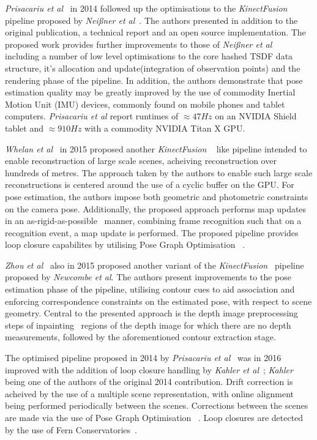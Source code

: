 \textit{Prisacariu et al}~\cite{Prisacariu2014, Kahler2015} in 2014 followed up the optimisations 
to the \textit{KinectFusion} pipeline proposed by \textit{Nei{\ss}ner et al}~\cite{NieBner2013}. 
The authors presented in addition to the original publication, a technical report and an open 
source implementation. The proposed work provides further improvements to those of 
\textit{Nei{\ss}ner et al}~\cite{NieBner2013} including a number of low level optimisations to the 
core hashed TSDF data structure, it's allocation and update(integration of observation points) and 
the rendering phase of the pipeline. In addition, the authors demonstrate that pose estimation quality 
may be greatly improved by the use of commodity Inertial Motion Unit (IMU) devices, commonly found 
on mobile phones and tablet computers. \textit{Prisacariu et al} report runtimes of 
\(\approx47Hz\) on an NVIDIA Shield tablet and \(\approx910Hz\) with a commodity NVIDIA Titan X GPU.

\textit{Whelan et al}~\cite{Whelan2015} in 2015 proposed another \textit{KinectFusion} 
~\cite{Newcombe2011} like pipeline intended to enable reconstruction of large scale scenes, 
acheiving reconstruction over hundreds of metres. The approach taken by the authors to enable 
such large scale reconstructions is centered around the use of a cyclic buffer on the GPU. For pose 
estimation, the authors impose both geometric and photometric constraints on the camera pose. 
Additionally, the proposed approach performs map updates in an as-rigid-as-possible~\cite{Igarashi2005} 
manner, combining frame recognition such that on a recognition event, a map update is performed.
The proposed pipeline provides loop closure capabilites by utilising Pose Graph Optimisation 
~\cite{Grisetti2010}.

\textit{Zhou et al}~\cite{Zhou2015} also in 2015 proposed another variant of the 
\textit{KinectFusion}~\cite{Newcombe2011} pipeline proposed by \textit{Newcombe et al}. 
The authors present improvements to the pose estimation phase of the pipeline, utilising 
contour cues to aid association and enforcing correspondence constraints on the estimated 
pose, with respect to scene geometry. Central to the presented approach is the depth image 
preprocessing steps of inpainting~\cite{Bertalmio2000} regions of the depth image for which 
there are no depth measurements, followed by the aforementioned contour extraction stage.

The optimised pipeline proposed in 2014 by \textit{Prisacariu et al}~\cite{Prisacariu2014} was 
in 2016 improved with the addition of loop closure handling by \textit{Kahler et al}~\cite{Kahler2016}; 
\textit{Kahler} being one of the authors of the original 2014 contribution. Drift correction is acheived 
by the use of a multiple scene representation, with online alignment being performed periodically 
between the scenes. Corrections between the scenes are made via the use of Pose Graph Optimisation 
~\cite{Grisetti2010}. Loop closures are detected by the use of Fern Conservatories~\cite{Glocker2014}.

